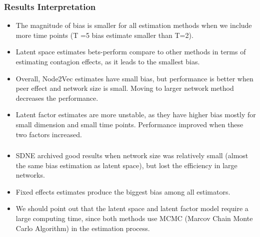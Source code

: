 \documentclass{beamer}
\begin{document}
\begin{frame}
\frametitle{ Results Interpretation}
\begin{itemize}
\item  The magnitude of bias is smaller for
all estimation methods when we include more time points (T =5 bias estimate smaller than T=2).
\vspace{10pt}
\item Latent space estimates bets-perform compare to other methods in terms of estimating contagion effects, as it leads to the smallest bias.
\vspace{10pt}
\item Overall, Node2Vec estimates have small
bias, but performance is  better when peer effect and network size is small. Moving to larger network method decreases the performance. 
\vspace{10pt}
\item Latent factor estimates are more unstable,
as they have  higher bias mostly for small dimension and small time points. Performance improved when these two factors increased.
\end{itemize}
\end{frame}
\begin{frame}
\frametitle{ }
\begin{itemize}

\item SDNE archived good results when network size was relatively small (almost the same bias estimation as latent space), but lost the efficiency in large networks. 
\vspace{10pt}
\item Fixed effects estimates produce the
biggest bias among all estimators.
\vspace{10pt}
\item We should point out that  the latent space and latent factor model require a large computing time, since both methods use MCMC (Marcov Chain Monte Carlo Algorithm) in the estimation process.
\end{itemize}
\end{frame}
\end{document}
